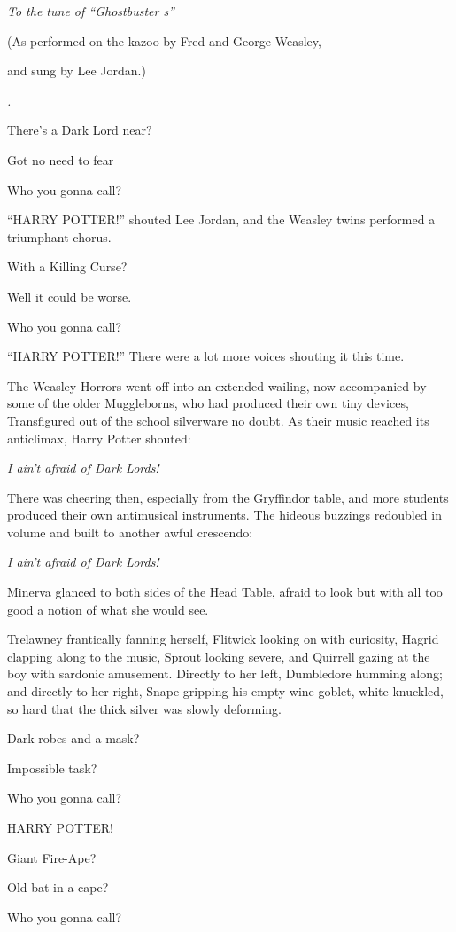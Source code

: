 \emph{To the tune of ``Ghostbuster s''}

(As performed on the kazoo by Fred and George Weasley,

and sung by Lee Jordan.)

\emph{.}

There's a Dark Lord near?

Got no need to fear

Who you gonna call?

``HARRY POTTER!'' shouted Lee Jordan, and the Weasley twins performed a triumphant chorus.

With a Killing Curse?

Well it could be worse.

Who you gonna call?

``HARRY POTTER!'' There were a lot more voices shouting it this time.

The Weasley Horrors went off into an extended wailing, now accompanied by some of the older Muggleborns, who had produced their own tiny devices, Transfigured out of the school silverware no doubt. As their music reached its anticlimax, Harry Potter shouted:

\emph{I ain't afraid of Dark Lords!}

There was cheering then, especially from the Gryffindor table, and more students produced their own antimusical instruments. The hideous buzzings redoubled in volume and built to another awful crescendo:

\emph{I ain't afraid of Dark Lords!}

Minerva glanced to both sides of the Head Table, afraid to look but with all too good a notion of what she would see.

Trelawney frantically fanning herself, Flitwick looking on with curiosity, Hagrid clapping along to the music, Sprout looking severe, and Quirrell gazing at the boy with sardonic amusement. Directly to her left, Dumbledore humming along; and directly to her right, Snape gripping his empty wine goblet, white-knuckled, so hard that the thick silver was slowly deforming.

Dark robes and a mask?

Impossible task?

Who you gonna call?

HARRY POTTER!

Giant Fire-Ape?

Old bat in a cape?

Who you gonna call?

